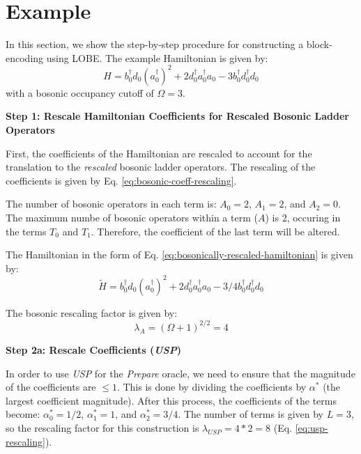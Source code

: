 \section{Example}
\label{subsec:example}

In this section, we show the step-by-step procedure for constructing a block-encoding using LOBE.
The example Hamiltonian is given by:
\begin{equation}
    \label{eq:example-ham}
    H = b_0^\dagger d_0(a_0^\dagger)^2 + 2 d_0^\dagger a_0^\dagger a_0 - 3 b_0^\dagger d_0^\dagger d_0
\end{equation}
with a bosonic occupancy cutoff of $\Omega = 3$.


\textbf{Step 1: Rescale Hamiltonian Coefficients for Rescaled Bosonic Ladder Operators}

First, the coefficients of the Hamiltonian are rescaled to account for the translation to the \textit{rescaled} bosonic ladder operators.
The rescaling of the coefficients is given by Eq. \ref{eq:bosonic-coeff-rescaling}.

The number of bosonic operators in each term is: $A_0 = 2$, $A_1 = 2$, and $A_2 = 0$. 
The maximum numbe of bosonic operators within a term ($A$) is $2$, occuring in the terms $T_0$ and $T_1$.
Therefore, the coefficient of the last term will be altered.

The Hamiltonian in the form of Eq. \ref{eq:bosonically-rescaled-hamiltonian} is given by:
\begin{equation}
    \tilde{H} = b_0^\dagger d_0(a_0^\dagger)^2 + 2 d_0^\dagger a_0^\dagger a_0 -  3/4 b_0^\dagger d_0^\dagger d_0
\end{equation}

The bosonic rescaling factor is given by:
\begin{equation}
    \lambda_A = (\Omega + 1)^{2/2} = 4
\end{equation}

\textbf{Step 2a: Rescale Coefficients (\textit{USP})}

In order to use \textit{USP} for the \textit{Prepare} oracle, we need to ensure that the magnitude of the coefficients are $\leq 1$.
This is done by dividing the coefficients by $\alpha^*$ (the largest coefficient magnitude).
After this process, the coefficients of the terms become: $\alpha^*_0 = 1/2$, $\alpha^*_1 = 1$, and $\alpha^*_2 = 3/4$.
The number of terms is given by $L = 3$, so the rescaling factor for this construction is $\lambda_{USP} = 4 * 2 = 8$ (Eq. \ref{eq:usp-rescaling}).

